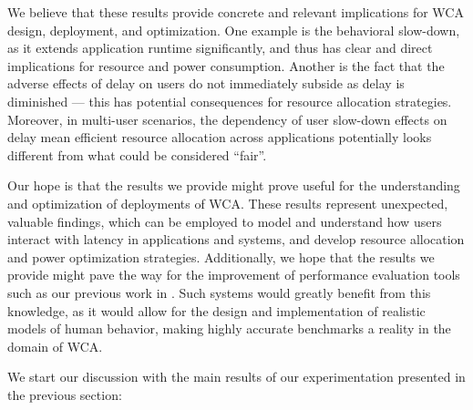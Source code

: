 
We believe that these results provide concrete and relevant implications for WCA design, deployment, and optimization.
One example is the behavioral slow-down, as it extends application runtime significantly, and thus has clear and
direct implications for resource and power consumption.
Another is the fact that the adverse effects of delay on users do not immediately subside as delay is diminished ---
this has potential consequences for resource allocation strategies.
Moreover, in multi-user scenarios, the dependency of user slow-down effects on delay mean efficient resource
allocation across applications potentially looks different from what could be considered ``fair''.

Our hope is that the results we provide might prove useful for the understanding and optimization of deployments of
WCA.\@
These results represent unexpected, valuable findings, which can be employed to model and understand how users
interact with latency in applications and systems, and develop resource allocation and power optimization strategies.
Additionally, we hope that the results we provide might pave the way for the improvement of performance evaluation
tools such as our previous work in \cite{olguin:2018, olguin:2019}.
Such systems would greatly benefit from this knowledge, as it would allow for the design and implementation of
realistic models of human behavior, making highly accurate benchmarks a reality in the domain of WCA.\@


We start our discussion with the main results of our experimentation presented in the previous section:

